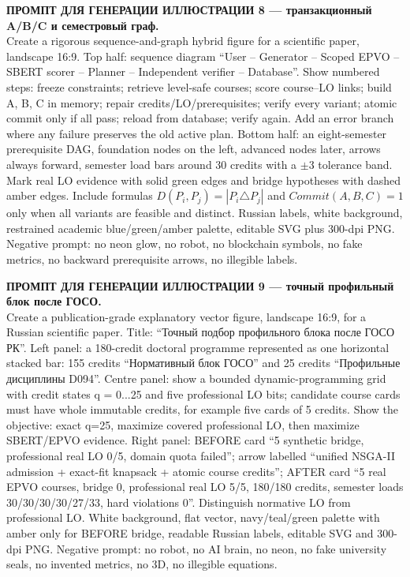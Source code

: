 \documentclass[twoside,11pt]{article}
\begin{document}
\medskip
\noindent\colorbox{yellow!25}{\parbox{0.96\linewidth}{
\textbf{ПРОМПТ ДЛЯ ГЕНЕРАЦИИ ИЛЛЮСТРАЦИИ 8 --- транзакционный A/B/C и семестровый граф.}\\
Create a rigorous sequence-and-graph hybrid figure for a scientific paper,
landscape 16:9. Top half: sequence diagram ``User -- Generator -- Scoped EPVO --
SBERT scorer -- Planner -- Independent verifier -- Database''. Show numbered
steps: freeze constraints; retrieve level-safe courses; score course--LO links;
build A, B, C in memory; repair credits/LO/prerequisites; verify every variant;
atomic commit only if all pass; reload from database; verify again. Add an error
branch where any failure preserves the old active plan. Bottom half: an
eight-semester prerequisite DAG, foundation nodes on the left, advanced nodes
later, arrows always forward, semester load bars around 30 credits with a
$\pm3$ tolerance band. Mark real LO evidence with solid green edges and bridge
hypotheses with dashed amber edges. Include formulas
$D(P_i,P_j)=|P_i\triangle P_j|$ and $Commit(A,B,C)=1$ only when all variants are
feasible and distinct. Russian labels, white background, restrained academic
blue/green/amber palette, editable SVG plus 300-dpi PNG. Negative prompt: no
neon glow, no robot, no blockchain symbols, no fake metrics, no backward
prerequisite arrows, no illegible labels.
}}

\medskip
\noindent\colorbox{yellow!25}{\parbox{0.96\linewidth}{
\textbf{ПРОМПТ ДЛЯ ГЕНЕРАЦИИ ИЛЛЮСТРАЦИИ 9 --- точный профильный блок после ГОСО.}\\
Create a publication-grade explanatory vector figure, landscape 16:9, for a
Russian scientific paper. Title: ``Точный подбор профильного блока после ГОСО
РК''. Left panel: a 180-credit doctoral programme represented as one horizontal
stacked bar: 155 credits ``Нормативный блок ГОСО'' and 25 credits
``Профильные дисциплины D094''. Centre panel: show a bounded dynamic-programming
grid with credit states q = 0...25 and five professional LO bits; candidate
course cards must have whole immutable credits, for example five cards of 5
credits. Show the objective: exact q=25, maximize covered professional LO,
then maximize SBERT/EPVO evidence. Right panel: BEFORE card ``5 synthetic
bridge, professional real LO 0/5, domain quota failed''; arrow labelled
``unified NSGA-II admission + exact-fit knapsack + atomic course credits'';
AFTER card ``5 real EPVO courses, bridge 0, professional real LO 5/5,
180/180 credits, semester loads 30/30/30/30/27/33, hard violations 0''.
Distinguish normative LO from professional LO. White background, flat vector,
navy/teal/green palette with amber only for BEFORE bridge, readable Russian
labels, editable SVG and 300-dpi PNG. Negative prompt: no robot, no AI brain,
no neon, no fake university seals, no invented metrics, no 3D, no illegible
equations.
}}
\end{document}
